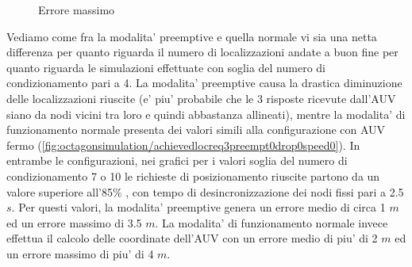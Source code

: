 \begin{figure}[H]
    \centering
    \hfill
    \caption{Errore massimo}
\end{figure}
Vediamo come fra la modalita' preemptive e quella normale vi sia una netta differenza per quanto riguarda il numero di localizzazioni andate a buon fine per quanto riguarda le simulazioni effettuate con soglia del numero di condizionamento pari a 4. La modalita' preemptive causa la drastica diminuzione delle localizzazioni riuscite (e' piu' probabile che le 3 risposte ricevute dall'AUV siano da nodi vicini tra loro e quindi abbastanza allineati), mentre la modalita' di funzionamento normale presenta dei valori simili alla configurazione con AUV fermo (\ref{fig:octagonsimulation/achievedlocreq3preempt0drop0speed0}).
In entrambe le configurazioni, nei grafici per i valori soglia del numero di condizionamento 7 o 10 le richieste di posizionamento riuscite partono da un valore superiore all'85\% , con tempo di desincronizzazione dei nodi fissi pari a 2.5 $s$.
Per questi valori, la modalita' preemptive genera un errore medio di circa 1 $m$ ed un errore massimo di 3.5 $m$. La modalita' di funzionamento normale invece effettua il calcolo delle coordinate dell'AUV con un errore medio di piu' di 2 $m$ ed un errore massimo di piu' di 4 $m$.
